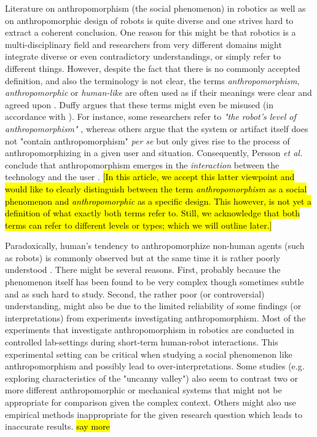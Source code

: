 \documentclass{frontiersSCNS} %
\begin{document}
Literature on anthropomorphism (the social phenomenon) in robotics as well as on
anthropomorphic design of robots is quite diverse and one strives hard to
extract a coherent conclusion. One reason for this might be that robotics is a
multi-disciplinary field and researchers from very different domains might
integrate diverse or even contradictory understandings, or simply refer to
different things. However, despite the fact that there is no commonly accepted
definition, and also the terminology is not clear, the terms
\textit{anthropomorphism}, \textit{anthropomorphic} or \textit{human-like} are
often used as if their meanings were clear and agreed upon
\cite{persson_anthropomorphism_2000}. Duffy \cite{duffy_anthropomorphism_2002}
argues that these terms might even be misused (in accordance with
\cite{epley_when_2008}). For instance, some researchers refer to \textit{"the
robot's level of anthropomorphism"} \cite{bartneck_is_2007}, whereas others
argue that the system or artifact itself does not "contain anthropomorphism"
\textit{per se} but only gives rise to the process of anthropomorphizing in a
given user and situation. Consequently, Persson \textit{et al.} conclude that
anthropomorphism emerges in the \textit{interaction} between the technology and
the user \cite{persson_anthropomorphism_2000}.  \hl{[In this article, we accept
this latter viewpoint and would like to clearly distinguish between the term
\textit{anthropomorphism} as a social phenomenon and \textit{anthropomorphic} as
a specific design. This however, is not yet a definition of what exactly both
terms refer to. Still, we acknowledge that both terms can refer to different
levels or types; which we will outline later.]} 

Paradoxically, human's tendency to anthropomorphize non-human agents (such as
robots) is commonly observed but at the same time it is rather poorly understood
\cite{epley_seeing_2007}. There might be several reasons. First, probably
because the phenomenon itself has been found to be very complex though sometimes
subtle and as such hard to study. Second, the rather poor (or controversial)
understanding, might also be due to the limited reliability of some findings (or
interpretations) from experiments investigating anthropomorphism. Most of the
experiments that investigate anthropomorphism in robotics are conducted in
controlled lab-settings during short-term human-robot interactions. This
experimental setting can be critical when studying a social phenomenon like
anthropomorphism and possibly lead to over-interpretations. Some studies (e.g.
exploring characteristics of the "uncanny valley") also seem to contrast two or
more different anthropomorphic or mechanical systems that might not be
appropriate for comparison given the complex context. Others might also use
empirical methods inappropriate for the given research question which leads to
inaccurate results. \hl{say more}
\end{document}
